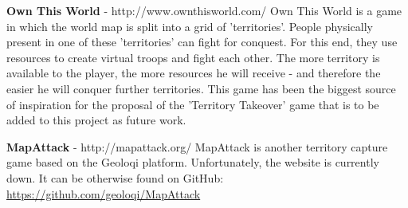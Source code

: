 \textbf{Own This World} - http://www.ownthisworld.com/ \newline
Own This World is a game in which the world map is split into a grid of
'territories'. People physically present in one of these 'territories' can fight
for conquest. For this end, they use resources to create virtual troops and
fight each other. The more territory is available to the player, the more
resources he will receive - and therefore the easier he will conquer further
territories. This game has been the biggest source of inspiration for the
proposal of the 'Territory Takeover' game that is to be added to this project as
future work.\newline

\textbf{MapAttack} - http://mapattack.org/ \newline
MapAttack is another territory capture game based on the Geoloqi platform.
Unfortunately, the website is currently down. It can be otherwise found on GitHub:
\url{https://github.com/geoloqi/MapAttack}\newline
